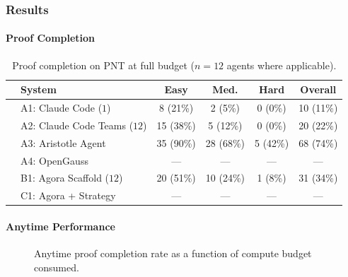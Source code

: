 \subsubsection{Results}\label{sec:app-results}

\paragraph{Proof Completion}

\begin{table}[ht]
\centering
\caption{Proof completion on PNT at full budget ($n=12$ agents where applicable).}
\label{tab:app-overall}
\renewcommand{\arraystretch}{1.15}
\begin{tabular}{ll|cccc}
\toprule
& \textbf{System} & \textbf{Easy} & \textbf{Med.} & \textbf{Hard} & \textbf{Overall} \\
\midrule
& A1: Claude Code ($1$) & 8 (21\%) & 2 (5\%) & 0 (0\%) & 10 (11\%) \\
& A2: Claude Code Teams ($12$) & 15 (38\%) & 5 (12\%) & 0 (0\%) & 20 (22\%) \\
& A3: Aristotle Agent & 35 (90\%) & 28 (68\%) & 5 (42\%) & 68 (74\%) \\
& A4: OpenGauss & --- & --- & --- & --- \\
\midrule
& B1: Agora Scaffold ($12$) & 20 (51\%) & 10 (24\%) & 1 (8\%) & 31 (34\%) \\
\midrule
& C1: Agora + Strategy & --- & --- & --- & --- \\
\bottomrule
\end{tabular}
\end{table}



\paragraph{Anytime Performance}

\begin{figure}[ht]
\centering
{}
\caption{Anytime proof completion rate as a function of compute budget consumed.}
\label{fig:anytime}
\end{figure}


